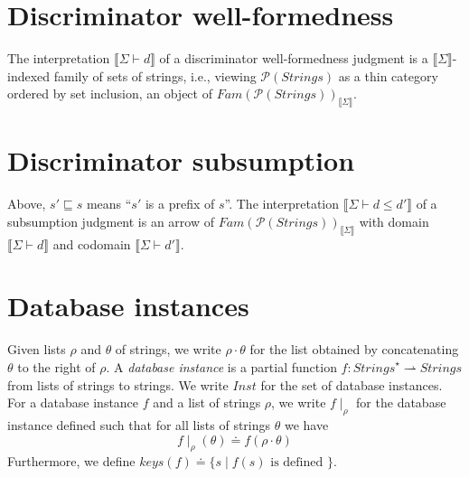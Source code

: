 \documentclass{article}
\newcommand{\sem}[1]{\llbracket #1 \rrbracket}
\begin{document}
\section*{Discriminator well-formedness}


The interpretation $\sem{\Sigma \vdash d}$ of a discriminator well-formedness judgment is a $\sem{\Sigma}$-indexed family of sets of strings, i.e., viewing $\mathcal P(\mathit{Strings})$ as a thin category ordered by set inclusion, an object of $\mathit{Fam}(\mathcal P(\mathit{Strings}))_{\sem{\Sigma}}$. 

\section*{Discriminator subsumption}


Above, $s' \sqsubseteq s$ means ``$s'$ is a prefix of $s$''. 
The interpretation $\sem{\Sigma \vdash d \leq d'}$ of a subsumption judgment is an arrow of $\mathit{Fam}(\mathcal P(\mathit{Strings}))_{\sem{\Sigma}}$ with domain $\sem{\Sigma \vdash d}$ and codomain $\sem{\Sigma \vdash d'}$.

\section*{Database instances}

Given lists $\rho$ and $\theta$ of strings, we write $\rho \cdot \theta$ for the list obtained by concatenating $\theta$ to the right of $\rho$.
A \emph{database instance} is a partial function $f : \mathit{Strings}^{\star} \rightharpoonup \mathit{Strings}$ from lists of strings to strings. We write $\mathit{Inst}$ for the set of database instances. For a database instance $f$ and a list of strings $\rho$, we write $f \! \mid_\rho$ for the database instance defined such that for all lists of strings $\theta$ we have $$f \! \mid_\rho \! (\theta) \doteq f(\rho \cdot \theta)$$
Furthermore, we define $\mathit{keys}(f) \doteq \{ s \mid f(s) \text{ is defined } \}$.
\end{document}
